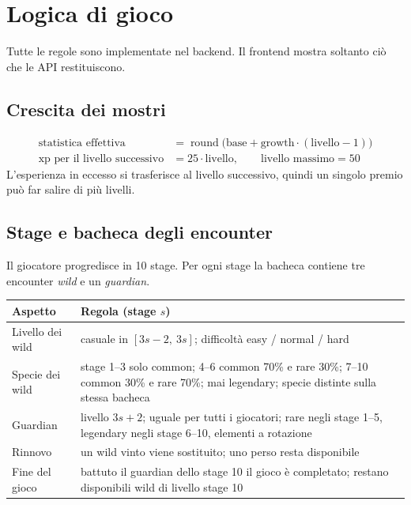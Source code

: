 \documentclass[11pt,a4paper]{report}
\begin{document}
\chapter{Logica di gioco}
\label{ch:game}

Tutte le regole sono implementate nel backend. Il frontend mostra soltanto ciò che le API restituiscono.

\section{Crescita dei mostri}

\begin{align*}
\text{statistica effettiva} &= \operatorname{round}\big(\text{base} + \text{growth}\cdot(\text{livello}-1)\big)\\
\text{xp per il livello successivo} &= 25 \cdot \text{livello}, \qquad \text{livello massimo} = 50
\end{align*}
L'esperienza in eccesso si trasferisce al livello successivo, quindi un singolo premio può far salire di più livelli.

\section{Stage e bacheca degli encounter}

Il giocatore progredisce in 10 stage. Per ogni stage la bacheca contiene tre encounter \emph{wild} e un \emph{guardian}.

\begin{center}\small
\begin{tabularx}{\linewidth}{@{}P{3.3cm}L@{}}
\toprule
\textbf{Aspetto} & \textbf{Regola (stage $s$)} \\
\midrule
Livello dei wild & casuale in $[3s-2,\ 3s]$; difficoltà easy / normal / hard \\
Specie dei wild & stage 1--3 solo common; 4--6 common 70\% e rare 30\%; 7--10 common 30\% e rare 70\%; mai legendary; specie distinte sulla stessa bacheca \\
Guardian & livello $3s+2$; uguale per tutti i giocatori; rare negli stage 1--5, legendary negli stage 6--10, elementi a rotazione \\
Rinnovo & un wild vinto viene sostituito; uno perso resta disponibile \\
Fine del gioco & battuto il guardian dello stage 10 il gioco è completato; restano disponibili wild di livello stage 10 \\
\bottomrule
\end{tabularx}
\end{center}
\end{document}
